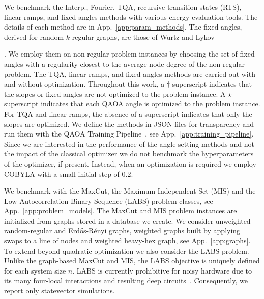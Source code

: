 \documentclass[twocolumn,
english,
aps,
pra,
10pt,
longbibliography,
superscriptaddress,
amsmath,
amssymb,
floatfix
]{revtex4-2}
\begin{document}
We benchmark the Interp., Fourier, TQA, recursive transition states (RTS), linear ramps, and fixed angles methods with various energy evaluation tools.
The details of each method are in App.~\ref{app:param_methods}.
The fixed angles, derived for random $k$-regular graphs, are those of Wurtz and Lykov~{\cite{Wurtz2021}.
We employ them on non-regular problem instances by choosing the set of fixed angles with a regularity closest to the average node degree of the non-regular problem.
The TQA, linear ramps, and fixed angles methods are carried out with and without optimization.
Throughout this work, a $\dagger$ superscript indicates that the slopes or fixed angles are not optimized to the problem instance.
A $\star$ superscript indicates that each QAOA angle is optimized to the problem instance.
For TQA and linear ramps, the absence of a superscript indicates that only the slopes are optimized.
We define the methods in JSON files for transparency and run them with the QAOA Training Pipeline~\cite{training_pipeline}, see App.~\ref{app:training_pipeline}.
Since we are interested in the performance of the angle setting methods and not the impact of the classical optimizer we do not benchmark the hyperparameters of the optimizer, if present.
Instead, when an optimization is required we employ COBYLA with a small initial step of $0.2$.

We benchmark with the MaxCut, the Maximum Independent Set (MIS) and the Low Autocorrelation Binary Sequence (LABS) problem classes, see App.~\ref{app:problem_models}.
The MaxCut and MIS problem instances are initialized from graphs stored in a database we create. 
We consider unweighted random-regular and Erd\H{o}s-R\'{e}nyi graphs, weighted graphs built by applying swaps to a line of nodes and weighted heavy-hex graph, see App.~\ref{app:graphs}. 
To extend beyond quadratic optimization we also consider the LABS problem. 
Unlike the graph-based MaxCut and MIS, the LABS objective is uniquely defined for each system size $n$. 
LABS is currently prohibitive for noisy hardware due to its many four-local interactions and resulting deep circuits~\cite{Dragoi2025}. 
Consequently, we report only statevector simulations. 

}
\end{document}
